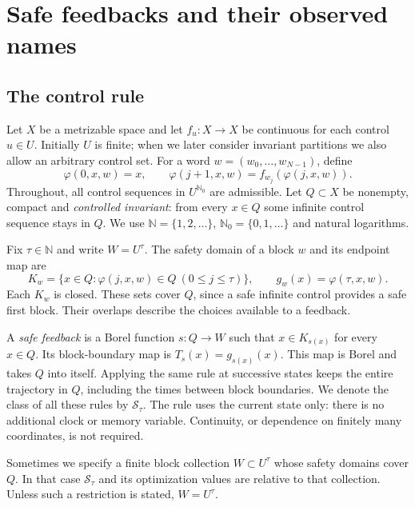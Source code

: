 \documentclass[11pt,reqno]{amsart}
\numberwithin{equation}{section}
\theoremstyle{definition}
\theoremstyle{definition}
\newcommand{\N}{\mathbb N}
\newcommand{\Nzero}{\mathbb N_0}
\newcommand{\Ssafe}{\mathcal S}
\begin{document}
\section{Safe feedbacks and their observed names}\label{sec:control}

\subsection{The control rule}\label{sec:selectors}
Let $X$ be a metrizable space and let $f_u:X\to X$ be continuous
for each control $u\in U$. Initially $U$ is finite; when we later
consider invariant partitions we also allow an arbitrary control set.
For a word $w=(w_0,\ldots,w_{N-1})$, define
\[
 \varphi(0,x,w)=x,\qquad
 \varphi(j+1,x,w)=f_{w_j}(\varphi(j,x,w)).
\]
Throughout, all control sequences in $U^{\Nzero}$ are admissible.
Let $Q\subset X$ be nonempty, compact and \emph{controlled invariant}:
from every $x\in Q$ some infinite control sequence stays in $Q$.
We use $\N=\{1,2,\ldots\}$, $\Nzero=\{0,1,\ldots\}$ and
natural logarithms.

Fix $\tau\in\N$ and write $W=U^\tau$. The safety domain of a
block $w$ and its endpoint map are
\begin{equation}\label{cc-eq:safe}
 K_w=\{x\in Q:\varphi(j,x,w)\in Q\ (0\le j\le\tau)\},
 \qquad g_w(x)=\varphi(\tau,x,w).
\end{equation}
Each $K_w$ is closed. These sets cover $Q$, since a safe infinite
control provides a safe first block. Their overlaps describe the
choices available to a feedback.

A \emph{safe feedback} is a Borel function $s:Q\to W$ such that
$x\in K_{s(x)}$ for every $x\in Q$. Its block-boundary map is
$T_s(x)=g_{s(x)}(x)$. This map is Borel and takes $Q$ into itself.
Applying the same rule at successive states keeps the entire trajectory
in $Q$, including the times between block boundaries. We denote the
class of all these rules by $\Ssafe_\tau$. The rule uses the current
state only: there is no additional clock or memory variable.
Continuity, or dependence on finitely many coordinates, is not required.

Sometimes we specify a finite block collection $W\subset U^\tau$
whose safety domains cover $Q$. In that case $\Ssafe_\tau$ and its
optimization values are relative to that collection. Unless such a
restriction is stated, $W=U^\tau$.
\end{document}
